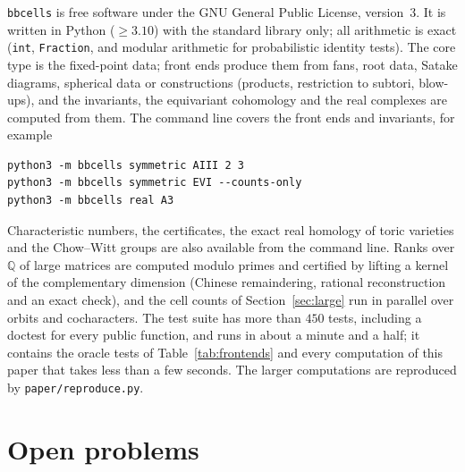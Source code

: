 \documentclass[11pt]{amsart}
\theoremstyle{definition}
\theoremstyle{remark}
\newcommand{\bbcells}{\texttt{bbcells}}
\newcommand{\code}[1]{\texttt{#1}}
\newcommand{\QQ}{\mathbb{Q}}
\begin{document}
\bbcells{} is free software under the GNU General Public License, version~3.
It is written in Python ($\ge3.10$) with the standard library only;
all arithmetic is exact (\code{int}, \code{Fraction}, and modular arithmetic
for probabilistic identity tests). The core type is the fixed-point data;
front ends produce them from fans, root data, Satake diagrams, spherical
data or constructions (products, restriction to subtori, blow-ups), and the
invariants, the equivariant cohomology and the real complexes are computed
from them. The command line covers the front ends and invariants, for
example
\begin{verbatim}
python3 -m bbcells symmetric AIII 2 3
python3 -m bbcells symmetric EVI --counts-only
python3 -m bbcells real A3
\end{verbatim}
Characteristic numbers, the certificates, the exact real homology of toric
varieties and the Chow--Witt groups are also available from the command
line. Ranks over $\QQ$ of large matrices are computed modulo primes and
certified by lifting a kernel of the complementary dimension (Chinese
remaindering, rational reconstruction and an exact check), and the cell
counts of Section~\ref{sec:large} run in parallel over orbits and
cocharacters. The test suite has more than $450$ tests, including a
doctest for every public function, and runs in about a minute and a half;
it contains the oracle tests of Table~\ref{tab:frontends} and every
computation of this paper that takes less than a few seconds. The larger
computations are reproduced by \code{paper/reproduce.py}.

\section{Open problems}\label{sec:open}
\end{document}
